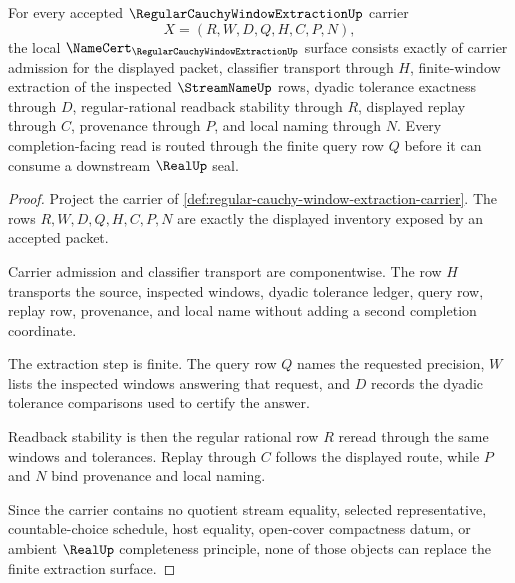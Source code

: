 \begin{theorem}
\label{thm:regular-cauchy-window-extraction-namecert-obligations}
For every accepted $\RegularCauchyWindowExtractionUp$ carrier
$$
X=(R,W,D,Q,H,C,P,N),
$$
the local $\NameCert_{\RegularCauchyWindowExtractionUp}$ surface consists exactly of carrier admission for the displayed packet, classifier transport through $H$, finite-window extraction of the inspected $\StreamNameUp$ rows, dyadic tolerance exactness through $D$, regular-rational readback stability through $R$, displayed replay through $C$, provenance through $P$, and local naming through $N$. Every completion-facing read is routed through the finite query row $Q$ before it can consume a downstream $\RealUp$ seal.
\end{theorem}
\begin{proof}
Project the carrier of \autoref{def:regular-cauchy-window-extraction-carrier}. The rows $R,W,D,Q,H,C,P,N$ are exactly the displayed inventory exposed by an accepted packet.

Carrier admission and classifier transport are componentwise. The row $H$ transports the source, inspected windows, dyadic tolerance ledger, query row, replay row, provenance, and local name without adding a second completion coordinate.

The extraction step is finite. The query row $Q$ names the requested precision, $W$ lists the inspected windows answering that request, and $D$ records the dyadic tolerance comparisons used to certify the answer.

Readback stability is then the regular rational row $R$ reread through the same windows and tolerances. Replay through $C$ follows the displayed route, while $P$ and $N$ bind provenance and local naming.

Since the carrier contains no quotient stream equality, selected representative, countable-choice schedule, host equality, open-cover compactness datum, or ambient $\RealUp$ completeness principle, none of those objects can replace the finite extraction surface.
\end{proof}

